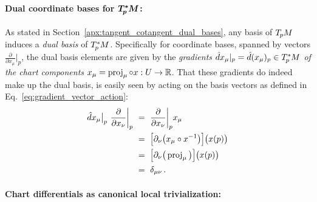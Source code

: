 \paragraph{Dual coordinate bases for $\bm{T_{\mkern-1.5mu p}^{\mkern-0mu *}\mkern-1muM}$:}

As stated in Section~\ref{apx:tangent_cotangent_dual_bases}, any basis of $T_{\mkern-1.5mu p}\mkern-.5muM$ induces a \emph{dual basis} of $T_{\mkern-1.5mu p}^{\mkern-0mu *}\mkern-1muM$.
Specifically for coordinate bases, spanned by vectors $\frac{\partial}{\partial x_\mu} \big|_p$, the dual basis elements are given by the \emph{gradients $\hat{d}x_\mu|_p = \hat{d}(x_\mu)_p \in T_{\mkern-1.5mu p}^{\mkern-0mu *}\mkern-1muM$ of the chart components} $x_\mu = \operatorname{proj}_\mu \circ x: U \to \mathbb{R}$.
That these gradients do indeed make up the dual basis, is easily seen by acting on the basis vectors as defined in Eq.~\eqref{eq:gradient_vector_action}:
\begin{align}
    \hat{d}x_\mu \big|_p\ \frac{\partial}{\partial x_\nu} \bigg|_p
    \ &=\ \frac{\partial}{\partial x_\nu} \bigg|_p x_\mu \notag \\
    \ &=\ \pig[ \partial_\nu \big( x_\mu \circ x^{-1} \big) \pig] \big(x(p)\big) \notag \\
    \ &=\ \pig[ \partial_\nu \big( \proj_\mu \big) \pig] \big(x(p)\big) \notag \\
    \ &=\ \delta_{\mu\nu} \,.
\end{align}





\paragraph{Chart differentials as canonical local trivialization:}

